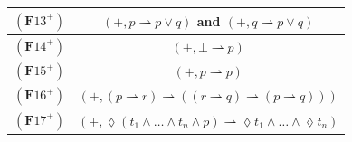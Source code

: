 \documentclass[draft]{article}
\def\Formula{\mathbf{A}}
\def\Formula{\mathbf{F}}
\begin{document}
\begin{table}[ht]
%
%
\begin{center}
%
%
\begin{tabular}{|c|c|}
%
%
\hline
%
%
$(\Formula13^{+})$&$(+,p{\rightharpoonup}p{\vee}q)$ and $(+,q{\rightharpoonup}p{\vee}q)$
%
%
\\
%
%
\hline
%
%
$(\Formula14^{+})$&$(+,\bot{\rightharpoonup}p)$
%
%
\\
%
%
\hline
%
%
$(\Formula15^{+})$&$(+,p{\rightharpoonup}p)$
%
%
\\
%
%
\hline
%
%
$(\Formula16^{+})$&$(+,(p{\rightharpoonup}r){\rightharpoonup}((r{\rightharpoonup}q){\rightharpoonup}(p{\rightharpoonup}q)))$
%
%
\\
%
%
\hline
%
%
%
%
%
%
%
%
%
%
%
%
%
%
%
%
%
%
%
%
%
%
%
%
%
%
%
%
%
%
%
%
%
%
%
%
%
%
%
%
%
%
%
%
%
%
%
%
%
%
%
%
%
%
%
%
$(\Formula17^{+})$&$(+,{\lozenge}(t_{1}{\wedge}\ldots{\wedge}t_{n}{\wedge}p){\rightharpoonup}{\lozenge}t_{1}{\wedge}\ldots{\wedge}{\lozenge}t_{n})$
%
%
\\

\end{tabular}
\end{center}
\end{table}
\end{document}
